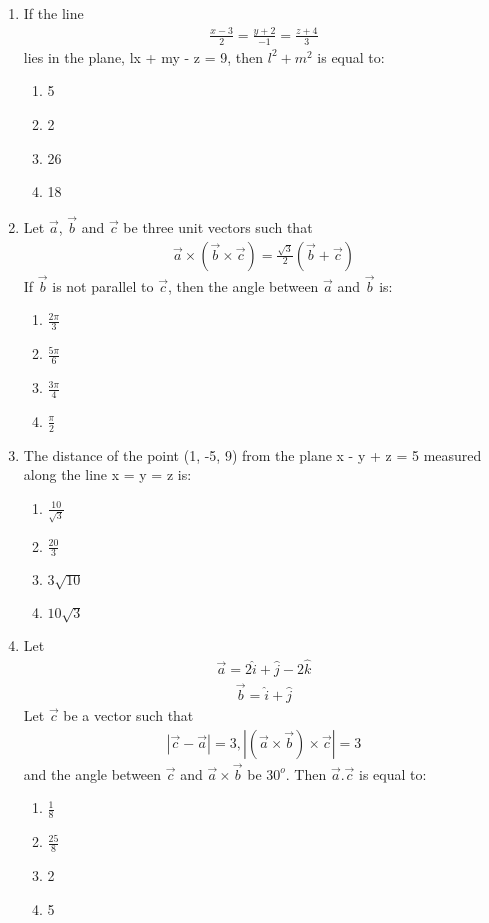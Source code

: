 \begin{enumerate}[label=\arabic*.,ref=\thesubsection.\theenumi]
\item If the line 
\begin{align*}
\frac{x-3}{2} = \frac{y+2}{-1} = \frac{z+4}{3}
\end{align*}
lies in the plane, lx + my - z = 9, then $l^2 + m^2$ is equal to:
\begin{enumerate}
\item 5
\item 2
\item 26
\item 18
\end{enumerate}

\item Let $\overrightarrow{a}$, $\overrightarrow{b}$ and $\overrightarrow{c}$ be three unit vectors such that
\begin{align*}
\overrightarrow{a} \times (\overrightarrow{b} \times \overrightarrow{c}) = \frac{\sqrt{3}}{2}(\overrightarrow{b} + \overrightarrow{c})
\end{align*}
If $\overrightarrow{b}$ is not parallel to $\overrightarrow{c}$, then the angle between $\overrightarrow{a}$ and $\overrightarrow{b}$ is:
\begin{enumerate}
\item $\frac{2\pi}{3}$
\item $\frac{5\pi}{6}$
\item $\frac{3\pi}{4}$
\item $\frac{\pi}{2}$
\end{enumerate}

\item The distance of the point (1, -5, 9) from the plane x - y + z = 5 measured along the line x = y = z is:
\begin{enumerate}
\item $\frac{10}{\sqrt{3}}$
\item $\frac{20}{3}$
\item $3\sqrt{10}$
\item $10\sqrt{3}$
\end{enumerate}

\item Let 
\begin{align*}
\overrightarrow{a} = 2\hat{i} + \hat{j} - 2\hat{k}
\end{align*}
\begin{align*}
\overrightarrow{b} = \hat{i} + \hat{j}
\end{align*} 
Let $\overrightarrow{c}$ be a vector such that
\begin{align*}
|\overrightarrow{c} - \overrightarrow{a}| = 3, |(\overrightarrow{a} \times \overrightarrow{b}) \times \overrightarrow{c}|=3
\end{align*}
and the angle between $\overrightarrow{c}$ and $\overrightarrow{a} \times \overrightarrow{b}$ be $30^{o}$. Then $\overrightarrow{a}.\overrightarrow{c}$ is equal to:
\begin{enumerate}
\item $\frac{1}{8}$
\item $\frac{25}{8}$
\item 2
\item 5
\end{enumerate}


\end{enumerate}
